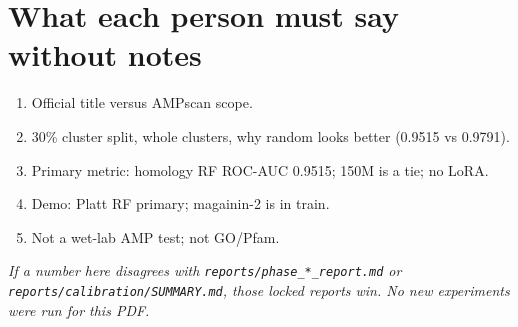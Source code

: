 \documentclass[11pt,a4paper]{report}
\begin{document}
\section{What each person must say without notes}

\begin{enumerate}
\item Official title versus AMPscan scope.
\item 30\% cluster split, whole clusters, why random looks better (0.9515 vs 0.9791).
\item Primary metric: homology RF ROC-AUC 0.9515; 150M is a tie; no LoRA.
\item Demo: Platt RF primary; magainin-2 is in train.
\item Not a wet-lab AMP test; not GO/Pfam.
\end{enumerate}

\vspace{2em}
\noindent\textit{If a number here disagrees with \texttt{reports/phase\_*\_report.md} or \texttt{reports/calibration/SUMMARY.md}, those locked reports win. No new experiments were run for this PDF.}
\end{document}
